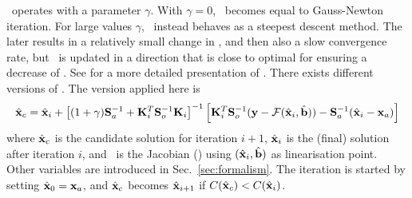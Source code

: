 \LM\ operates with a parameter $\gamma$. With $\gamma=0$, \LM\ becomes equal to
Gauss-Newton iteration. For large values $\gamma$, \LM\ instead behaves as a
steepest descent method. The later results in a relatively small change in
\SttVct, and then also a slow convergence rate, but \SttVct\ is updated in a
direction that is close to optimal for ensuring a decrease of \CstFnc. See
\citet[][Sec.~5.7]{rodgers:00} for a more detailed presentation of \LM.
There exists different versions of \LM. The version applied here is
\citep[][Eq.~5.36]{rodgers:00}
\begin{equation}
  \label{eq:ml}
  \hat{\mathbf{x}}_c = \hat{\mathbf{x}}_i + 
  \left[ (1+\gamma)\mathbf{S}_{a}^{-1} + 
          \mathbf{K}_{i}^T\mathbf{S}_{o}^{-1}\mathbf{K}_{i} \right]^{-1}
  \left[ \mathbf{K}_{i}^T\mathbf{S}_{o}^{-1}(\mathbf{y}-\mathcal{F}(\hat{\mathbf{x}}_i,\hat{\mathbf{b}})) -
         \mathbf{S}_{a}^{-1}(\hat{\mathbf{x}}_i-\mathbf{x}_{a})\right]
\end{equation}
where $\hat{\mathbf{x}}_c$ is the candidate solution for iteration $i+1$, $\hat{\mathbf{x}}_i$ is
the (final) solution after iteration $i$, and \ is the Jacobian
(\aWfnMtr{\SttVct}) using $(\hat{\mathbf{x}}_i,\hat{\mathbf{b}})$ as linearisation point.
Other variables are introduced in Sec.~\ref{sec:formalism}. The iteration is
started by setting $\hat{\mathbf{x}}_0 = \mathbf{x}_{a}$, and $\hat{\mathbf{x}}_c$ becomes
$\hat{\mathbf{x}}_{i+1}$ if $C(\hat{\mathbf{x}}_c) < C(\hat{\mathbf{x}}_i)$.


